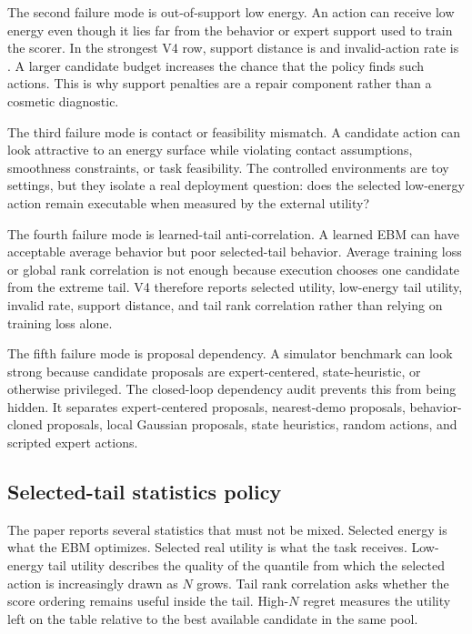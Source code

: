 The second failure mode is out-of-support low energy. An action can receive
low energy even though it lies far from the behavior or expert support used to
train the scorer. In the strongest V4 row, support distance is
\VFourEBMRawSupportDistance{} and invalid-action rate is
\VFourEBMRawHighNInvalid{}. A larger candidate budget increases the chance
that the policy finds such actions. This is why support penalties are a
repair component rather than a cosmetic diagnostic.

The third failure mode is contact or feasibility mismatch. A candidate action
can look attractive to an energy surface while violating contact assumptions,
smoothness constraints, or task feasibility. The controlled environments are
toy settings, but they isolate a real deployment question: does the selected
low-energy action remain executable when measured by the external utility?

The fourth failure mode is learned-tail anti-correlation. A learned EBM can
have acceptable average behavior but poor selected-tail behavior. Average
training loss or global rank correlation is not enough because execution
chooses one candidate from the extreme tail. V4 therefore reports selected
utility, low-energy tail utility, invalid rate, support distance, and tail
rank correlation rather than relying on training loss alone.

The fifth failure mode is proposal dependency. A simulator benchmark can look
strong because candidate proposals are expert-centered, state-heuristic, or
otherwise privileged. The closed-loop dependency audit prevents this from
being hidden. It separates expert-centered proposals, nearest-demo proposals,
behavior-cloned proposals, local Gaussian proposals, state heuristics, random
actions, and scripted expert actions.

\subsection{Selected-tail statistics policy}
\label{app:V4-stat-policy}

The paper reports several statistics that must not be mixed. Selected energy
is what the EBM optimizes. Selected real utility is what the task receives.
Low-energy tail utility describes the quality of the quantile from which the
selected action is increasingly drawn as \(N\) grows. Tail rank correlation
asks whether the score ordering remains useful inside the tail. High-\(N\)
regret measures the utility left on the table relative to the best available
candidate in the same pool.

